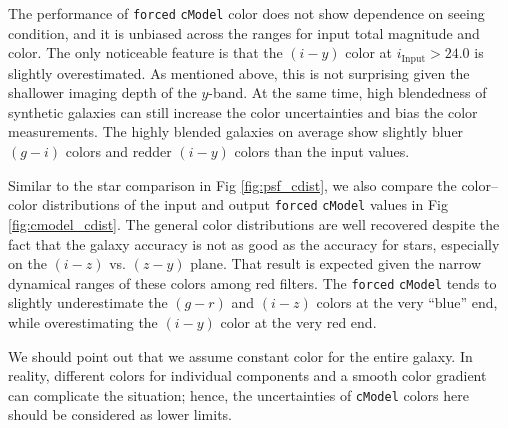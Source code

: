 \documentclass[useamsfonts]{pasj01}
\def\cmodel{\texttt{cModel}}
\def\forced{\texttt{forced}}
\begin{document}
    The performance of \forced{} \cmodel{} color does not show dependence on seeing
    condition, and it is unbiased across the ranges for input total magnitude and color.
    The only noticeable feature is that the $(i-y)$ color at 
    $i_{\mathrm{Input}}>24.0$ is slightly overestimated. 
    As mentioned above, this is not surprising given the shallower imaging depth of  the
    $y$-band.    
    At the same time, high blendedness of synthetic galaxies can still increase the 
   color uncertainties and bias the color measurements.
    The highly blended galaxies on average show slightly bluer  $(g-i)$ colors
     and redder  $(i-y)$ colors  than the input values.
    
    Similar to the star comparison in Fig \ref{fig:psf_cdist}, we also compare the color--color distributions 
    of the input and output \forced{} \cmodel{} values in Fig \ref{fig:cmodel_cdist}. 
    The general color distributions are well recovered despite the fact that the galaxy accuracy is 
    not as good as the accuracy for stars, especially on the $(i-z)$ vs. $(z-y)$ plane. 
    That result is expected given the narrow dynamical ranges of these colors among red filters.
    The \forced{} \cmodel{} tends to slightly underestimate the $(g-r)$ and $(i-z)$ 
    colors at the very ``blue'' end, while overestimating the $(i-y)$ color at the very 
    red end. 
    
   We should point out that we assume constant color for the entire galaxy.  
    In reality, different colors for individual components and a smooth color gradient 
    can complicate the situation; hence, the uncertainties of \cmodel{} colors 
    here should be considered as lower limits.
\end{document}
